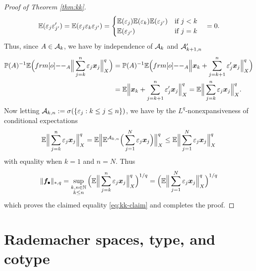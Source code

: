 \begin{proof}[Proof of Theorem \ref{thm:kk}]
  \begin{equation*}
    \mathbb{E}(\varepsilon_j \varepsilon_{j'}^\prime) = \mathbb{E}(\varepsilon_j \varepsilon_k \varepsilon_{j'})
    =
    \begin{cases}
      \mathbb{E}(\varepsilon_j) \mathbb{E}(\varepsilon_k) \mathbb{E}(\varepsilon_{j'}) & \text{if $j < k$} \\
       \mathbb{E}(\varepsilon_{j'}) & \text{if $j = k$}
    \end{cases}
    \quad = 0.
  \end{equation*}
  Thus, since $A \in \mathcal{A}_k$, we have by independence of $\mathcal{A}_k$ and $\mathcal{A}^{\prime}_{k+1, n}$
  \begin{equation*}
    \begin{aligned}
      \P(A)^{-1} \E \Big( \1_{A} \Big\| \sum_{j=k}^{n} \varepsilon_j \mb{x}_j\Big\|_{X}^q \Big)
      &=  \P(A)^{-1} \E \Big( \1_{A} \Big\|\mb{x}_k + \sum_{j=k+1}^{n} \varepsilon_{j}^{\prime} \mb{x}_j \Big\|_{X}^{q} \Big) \\
      &=  \E \Big\|\mb{x}_k + \sum_{j=k+1}^{n} \varepsilon_{j}^{\prime} \mb{x}_j \Big\|_{X}^{q} 
      =  \E  \Big\|\sum_{j=k}^{n} \varepsilon_{j} \mb{x}_j \Big\|_{X}^{q}. \\
    \end{aligned}
  \end{equation*}
  Now letting $\mathcal{A}_{k,n} := \sigma(\{\varepsilon_j : k \leq j \leq n\})$, we have by the $L^q$-nonexpansiveness of conditional expectations
  \begin{equation*}
    \mathbb{E} \Big\|\sum_{j=k}^{n} \varepsilon_{j} \bm{x}_j \Big\|_{X}^{q}
    = \mathbb{E} \Big\|\mathbb{E}^{\mathcal{A}_{k,n}} \Big(\sum_{j=1}^{N} \varepsilon_{j} \bm{x}_j \Big)\Big\|_{X}^{q}
    \leq \mathbb{E} \Big\|\sum_{j=1}^{N} \varepsilon_{j} \bm{x}_j \Big\|_{X}^{q}
  \end{equation*}
  with equality when $k=1$ and $n=N$.
  Thus
  \begin{equation*}
    \|\bm{f}_{\bullet}\|_{*,q} =  \sup_{\substack{k,n \in \mathbb{N} \\ k \leq n}}  \Big(\mathbb{E}  \Big\|\sum_{j=k}^{n} \varepsilon_{j} \bm{x}_j \Big\|_{X}^{q}\Big)^{1/q} = \Big(\mathbb{E}  \Big\|\sum_{j=1}^{N} \varepsilon_{j} \bm{x}_j \Big\|_{X}^{q}\Big)^{1/q}
  \end{equation*}
  which proves the claimed equality \eqref{eq:kk-claim} and completes the proof. 
\end{proof}

\section{Rademacher spaces, type, and cotype}

